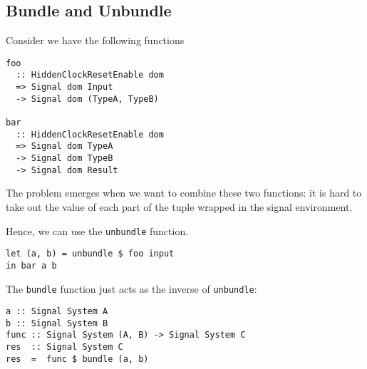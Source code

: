 \subsection{Bundle and Unbundle}
Consider we have the following functions
\begin{verbatim}
foo
  :: HiddenClockResetEnable dom
  => Signal dom Input
  -> Signal dom (TypeA, TypeB)

bar
  :: HiddenClockResetEnable dom
  => Signal dom TypeA
  -> Signal dom TypeB
  -> Signal dom Result
\end{verbatim}
The problem emerges when we want to combine these two functions: it is hard to take out the value of each part of the tuple wrapped in the signal environment.

Hence, we can use the \texttt{unbundle} function.
\begin{verbatim}
let (a, b) = unbundle $ foo input
in bar a b
\end{verbatim}
The \texttt{bundle} function just acts as the inverse of \texttt{unbundle}:
\begin{verbatim}
a :: Signal System A
b :: Signal System B
func :: Signal System (A, B) -> Signal System C
res  :: Signal System C
res  =  func $ bundle (a, b)
\end{verbatim}